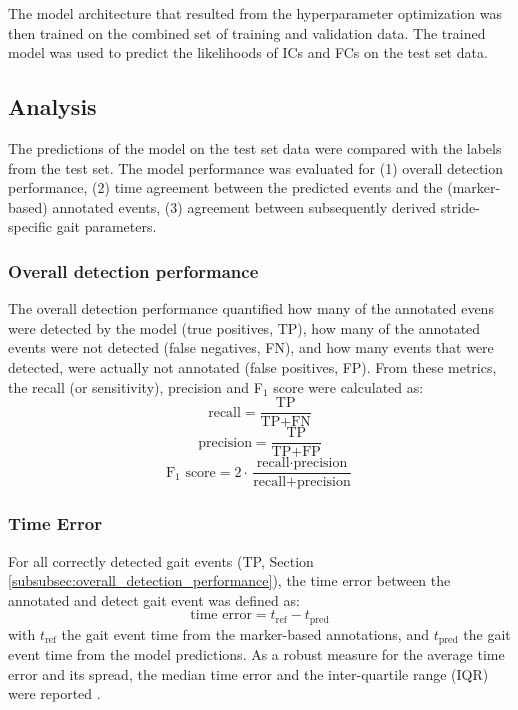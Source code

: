 \documentclass[sensors,article,submit,pdftex,moreauthors]{Definitions/mdpi}
\begin{document}
The model architecture that resulted from the hyperparameter optimization was then trained on the combined set of training and validation data. The trained model was used to predict the likelihoods of ICs and FCs on the test set data.

\subsection{Analysis}
The predictions of the model on the test set data were compared with the labels from the test set. The model performance was evaluated for (1) overall detection performance, (2) time agreement between the predicted events and the (marker-based) annotated events, (3) agreement between subsequently derived stride-specific gait parameters.
\subsubsection{Overall detection performance \label{subsubsec:overall_detection_performance}}
The overall detection performance quantified how many of the annotated evens were detected by the model (true positives, TP), how many of the annotated events were not detected (false negatives, FN), and how many events that were detected, were actually not annotated (false positives, FP). From these metrics, the recall (or sensitivity), precision and F$_{1}$ score were calculated as:
\begin{equation}
	\textrm{recall} = \frac{\textrm{TP}}{\textrm{TP} + \textrm{FN}} 
	\label{eqn:recall}
\end{equation}
\begin{equation}
	\textrm{precision} = \frac{\textrm{TP}}{\textrm{TP} + \textrm{FP}} 
	\label{eqn:precision}
\end{equation}
\begin{equation}
	\textrm{F$_{1}$ score} = 2 \cdot \frac{\textrm{recall} \cdot \textrm{precision}}{\textrm{recall} + \textrm{precision}} 
	\label{eqn:f1_score}
\end{equation}

\subsubsection{Time Error}
For all correctly detected gait events (TP, Section \ref{subsubsec:overall_detection_performance}), the time error between the annotated and detect gait event was defined as:
\begin{equation}
	\textrm{time error} = t_{\textrm{ref}} - t_{\textrm{pred}}
	\label{eqn:time_agreement}
\end{equation}
with $t_{\mathrm{ref}}$ the gait event time from the marker-based annotations, and $t_{\mathrm{pred}}$ the gait event time from the model predictions. As a robust measure for the average time error and its spread, the median time error and the inter-quartile range (IQR) were reported \cite{OpenIntro2019}.
\end{document}
